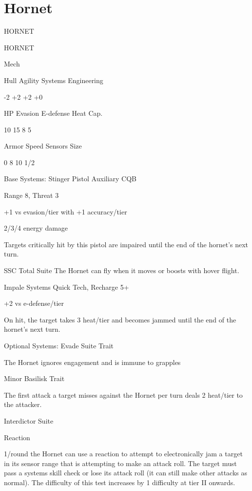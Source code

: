 \section{Hornet}

                                                HORNET  

 HORNET 

 Mech 

 Hull       Agility      Systems       Engineering 

 -2         +2           +2            +0 

 HP         Evasion      E-defense     Heat Cap. 

 10         15           8             5 

 Armor      Speed        Sensors       Size 

 0          8            10            1/2  

Base Systems:  
Stinger Pistol  
Auxiliary CQB
 
Range 8, Threat 3
 
+1 vs evasion/tier with +1 accuracy/tier
 
2/3/4 energy damage
 
Targets critically hit by this pistol are impaired until the end of the hornet’s next turn.
 

SSC Total Suite  
The Hornet can fly when it moves or boosts with hover flight.
 

Impale Systems  
Quick Tech, Recharge 5+
 
+2 vs e-defense/tier
 
On hit, the target takes 3 heat/tier and becomes jammed until the end of the hornet’s next turn.
 

Optional Systems:  
Evade Suite  
Trait
 
The Hornet ignores engagement and is immune to grapples
 

Minor Basilisk  
Trait
 
The first attack a target misses against the Hornet per turn deals 2 heat/tier to the attacker.
 

Interdictor Suite
 
Reaction
 

                                                                                                           


1/round the Hornet can use a reaction to attempt to electronically jam a target in its sensor range  
that is attempting to make an attack roll. The target must pass a systems skill check or lose its  
attack roll (it can still make other attacks as normal). The difficulty of this test increases by 1  
difficulty at tier II onwards.
 

